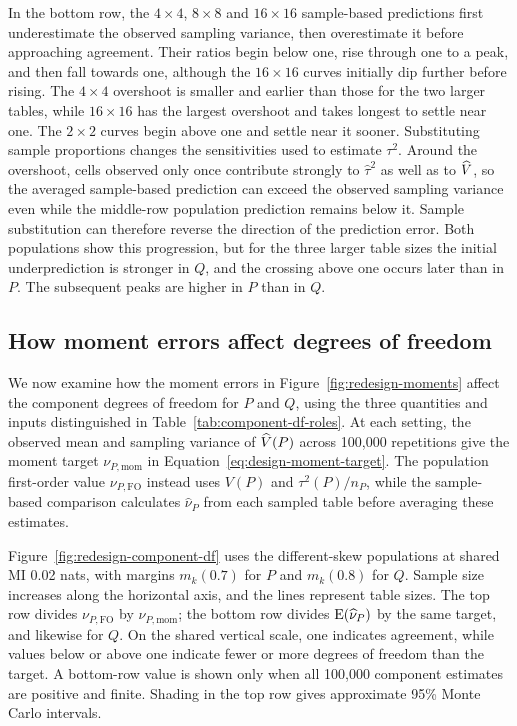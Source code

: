 In the bottom row, the \(4\times4\), \(8\times8\) and
\(16\times16\) sample-based predictions first underestimate the
observed sampling variance, then overestimate it before approaching
agreement. Their ratios begin below one, rise through one to a peak,
and then fall towards one, although the \(16\times16\) curves initially
dip further before rising. The \(4\times4\) overshoot is smaller and
earlier than those for the two larger tables, while \(16\times16\)
has the largest overshoot and takes longest to settle near one.
The \(2\times2\) curves begin above one and settle near it sooner.
Substituting sample proportions changes the sensitivities used to
estimate \(\tau^2\). Around the overshoot, cells observed only once
contribute strongly to \(\widehat\tau^2\) as well as to \(\widehat V\),
so the averaged sample-based prediction can exceed the observed
sampling variance even while the middle-row population prediction
remains below it. Sample substitution can therefore reverse the
direction of the prediction error. Both populations show this
progression, but for the three larger table sizes the initial
underprediction is stronger in \(Q\), and the crossing above one
occurs later than in \(P\). The subsequent peaks are higher in \(P\)
than in \(Q\).

\FloatBarrier
\subsection{How moment errors affect degrees of freedom}

We now examine how the moment errors in Figure~\ref{fig:redesign-moments}
affect the component degrees of freedom for \(P\) and \(Q\), using the
three quantities and inputs distinguished in Table~\ref{tab:component-df-roles}. At each setting, the observed
mean and sampling variance of \(\widehat V(P)\) across 100,000 repetitions
give the moment target \(\nu_{P,\mathrm{mom}}\) in
Equation~\eqref{eq:design-moment-target}. The population first-order value
\(\nu_{P,\mathrm{FO}}\) instead uses \(V(P)\) and \(\tau^2(P)/n_P\),
while the sample-based comparison calculates \(\widehat\nu_P\) from
each sampled table before averaging these estimates.


Figure~\ref{fig:redesign-component-df} uses the different-skew populations
at shared MI 0.02 nats, with margins \(m_k(0.7)\) for \(P\) and
\(m_k(0.8)\) for \(Q\). Sample size increases along the horizontal axis,
and the lines represent table sizes. The top row divides
\(\nu_{P,\mathrm{FO}}\) by \(\nu_{P,\mathrm{mom}}\); the bottom row divides
\(\operatorname{E}(\widehat\nu_P)\) by the same target, and likewise for \(Q\).
On the shared vertical scale, one indicates agreement, while values below
or above one indicate fewer or more degrees of freedom than the target. A bottom-row value is shown only when all 100,000 component
estimates are positive and finite. Shading in the top row gives approximate
95\% Monte Carlo intervals.

